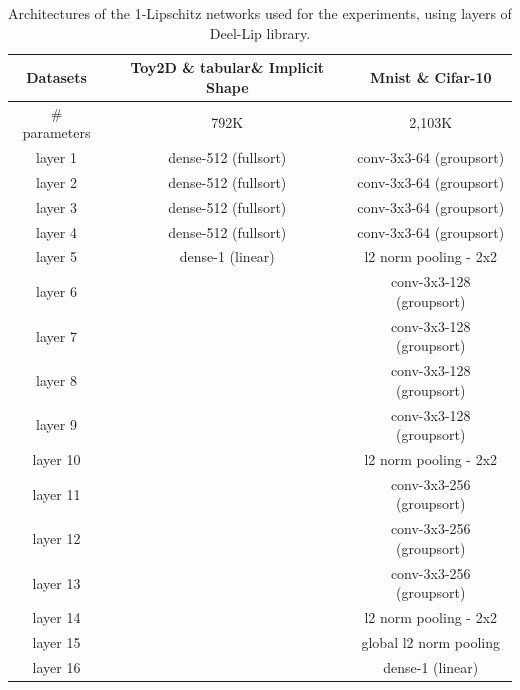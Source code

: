 \begin{table}%
    \centering
    \begin{tabular}{|c|cc|}
            \hline
            Datasets & Toy2D \& tabular\& Implicit Shape & Mnist \& Cifar-10 \\
            \hline
            \hline
            \# parameters & 792K  &  2,103K  \\
            \hline
            layer 1 &   dense-512 (fullsort)  &  conv-3x3-64 (groupsort)\\
            layer 2 &   dense-512 (fullsort)  &  conv-3x3-64 (groupsort)\\
            layer 3 &   dense-512 (fullsort)  &  conv-3x3-64 (groupsort)\\
            layer 4 &   dense-512 (fullsort)  &  conv-3x3-64 (groupsort)\\
            layer 5 &   dense-1 (linear)      &  l2 norm pooling - 2x2 \\
            layer 6 &                         &  conv-3x3-128 (groupsort)\\
            layer 7 &                         &  conv-3x3-128 (groupsort)\\
            layer 8 &                         &  conv-3x3-128 (groupsort)\\
            layer 9 &                         &  conv-3x3-128 (groupsort)\\
            layer 10 &                         &  l2 norm pooling - 2x2 \\
            layer 11 &                         &  conv-3x3-256 (groupsort)\\
            layer 12 &                         &  conv-3x3-256 (groupsort)\\
            layer 13 &                         &  conv-3x3-256 (groupsort)\\
            layer 14 &                         &  l2 norm pooling - 2x2 \\
            layer 15 &                         &  global l2 norm pooling \\
            layer 16 &                         &  dense-1 (linear) \\
            \hline
            \end{tabular}
    \caption{Architectures of the 1-Lipschitz networks used for the experiments, using layers of Deel-Lip library.}
    \label{tab:mnistarch}
\end{table}

